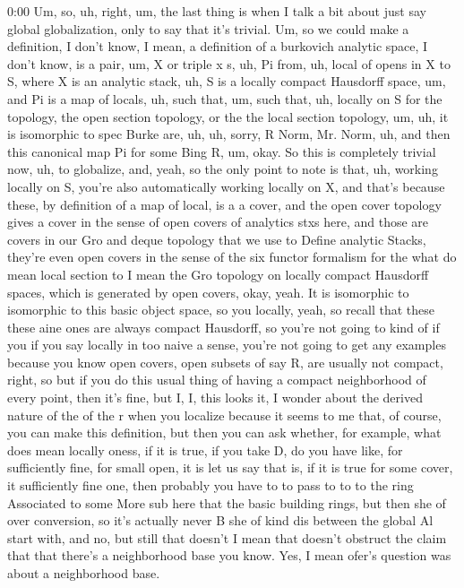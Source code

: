 \begin{unfinished}{0:00}
Um, so, uh, right, um, the last thing is when I talk a bit about just say global globalization, only to say that it's trivial. Um, so we could make a definition, I don't know, I mean, a definition of a burkovich analytic space, I don't know, is a pair, um, X or triple x s, uh, Pi from, uh, local of opens in X to S, where X is an analytic stack, uh, S is a locally compact Hausdorff space, um, and Pi is a map of locals, uh, such that, um, such that, uh, locally on S for the topology, the open section topology, or the the local section topology, um, uh, it is isomorphic to spec Burke are, uh, uh, sorry, R Norm, Mr. Norm, uh, and then this canonical map Pi for some Bing R, um, okay. So this is completely trivial now, uh, to globalize, and, yeah, so the only point to note is that, uh, working locally on S, you're also automatically working locally on X, and that's because these, by definition of a map of local, is a a cover, and the open cover topology gives a cover in the sense of open covers of analytics stxs here, and those are covers in our Gro and deque topology that we use to Define analytic Stacks, they're even open covers in the sense of the six functor formalism for the what do mean local section to I mean the Gro topology on locally compact Hausdorff spaces, which is generated by open covers, okay, yeah. It is isomorphic to isomorphic to this basic object space, so you locally, yeah, so recall that these these aine ones are always compact Hausdorff, so you're not going to kind of if you if you say locally in too naive a sense, you're not going to get any examples because you know open covers, open subsets of say R, are usually not compact, right, so but if you do this usual thing of having a compact neighborhood of every point, then it's fine, but I, I, this looks it, I wonder about the derived nature of the of the r when you localize because it seems to me that, of course, you can make this definition, but then you can ask whether, for example, what does mean locally oness, if it is true, if you take D, do you have like, for sufficiently fine, for small open, it is let us say that is, if it is true for some cover, it sufficiently fine one, then probably you have to to pass to to to the ring Associated to some
More sub here that the basic building rings, but then she of over conversion, so it's actually never B she of kind dis between the global Al start with, and no, but still that doesn't I mean that doesn't obstruct the claim that that there's a neighborhood base you know. Yes, I mean ofer's question was about a neighborhood base.


\end{unfinished}

